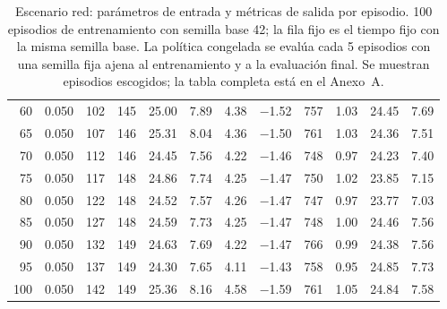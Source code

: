 \begin{table}[H]
\begin{tabular}{rrrrrrrrrrrr}
60 & 0.050 & 102 & 145 & 25.00 & 7.89 & 4.38 & $-$1.52 & 757 & 1.03 & 24.45 & 7.69 \\
65 & 0.050 & 107 & 146 & 25.31 & 8.04 & 4.36 & $-$1.50 & 761 & 1.03 & 24.36 & 7.51 \\
70 & 0.050 & 112 & 146 & 24.45 & 7.56 & 4.22 & $-$1.46 & 748 & 0.97 & 24.23 & 7.40 \\
75 & 0.050 & 117 & 148 & 24.86 & 7.74 & 4.25 & $-$1.47 & 750 & 1.02 & 23.85 & 7.15 \\
80 & 0.050 & 122 & 148 & 24.52 & 7.57 & 4.26 & $-$1.47 & 747 & 0.97 & 23.77 & 7.03 \\
85 & 0.050 & 127 & 148 & 24.59 & 7.73 & 4.25 & $-$1.47 & 748 & 1.00 & 24.46 & 7.56 \\
90 & 0.050 & 132 & 149 & 24.63 & 7.69 & 4.22 & $-$1.47 & 766 & 0.99 & 24.38 & 7.56 \\
95 & 0.050 & 137 & 149 & 24.30 & 7.65 & 4.11 & $-$1.43 & 758 & 0.95 & 24.85 & 7.73 \\
100 & 0.050 & 142 & 149 & 25.36 & 8.16 & 4.58 & $-$1.59 & 761 & 1.05 & 24.84 & 7.58 \\
\bottomrule
\end{tabular}
\caption[Escenario red: episodios de entrenamiento]{Escenario red: parámetros de entrada y métricas de salida por episodio. 100 episodios de entrenamiento con semilla base 42; la fila fijo es el tiempo fijo con la misma semilla base. La política congelada se evalúa cada 5 episodios con una semilla fija ajena al entrenamiento y a la evaluación final. Se muestran episodios escogidos; la tabla completa está en el Anexo~A.}
\label{tab:red-episodios-resumen}
\end{table}

